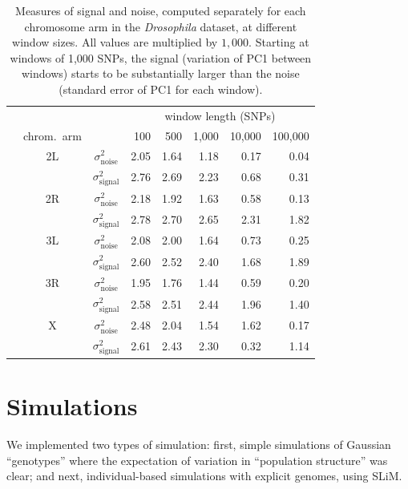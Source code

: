 \documentclass[11pt, oneside]{article}   	%
\begin{document}
\begin{table}[ht]
\centering
    \begin{tabular}{cccrrrrr}
  \hline
        & & & \multicolumn{5}{c}{window length (SNPs)} \\
 & chrom.\ arm  & & 100 & 500 & 1,000 & 10,000 & 100,000 \\ 
  \hline
    & 2L & $\sigma^2_\text{noise}$  & 2.05  &  1.64  &  1.18  &  0.17  &  0.04 \\
    & 	 & $\sigma^2_\text{signal}$ & 2.76  &  2.69  &  2.23  &  0.68  &  0.31 \\
    & 2R & $\sigma^2_\text{noise}$  & 2.18  &  1.92  &  1.63  &  0.58  &  0.13 \\
    & 	 & $\sigma^2_\text{signal}$ & 2.78  &  2.70  &  2.65  &  2.31  &  1.82 \\
    & 3L & $\sigma^2_\text{noise}$  & 2.08  &  2.00  &  1.64  &  0.73  &  0.25 \\
    & 	 & $\sigma^2_\text{signal}$ & 2.60  &  2.52  &  2.40  &  1.68  &  1.89 \\
    & 3R & $\sigma^2_\text{noise}$  & 1.95  &  1.76  &  1.44  &  0.59  &  0.20 \\
    & 	 & $\sigma^2_\text{signal}$ & 2.58  &  2.51  &  2.44  &  1.96  &  1.40 \\
    & X  & $\sigma^2_\text{noise}$  & 2.48  &  2.04  &  1.54  &  1.62  &  0.17 \\
    & 	 & $\sigma^2_\text{signal}$ & 2.61  &  2.43  &  2.30  &  0.32  &  1.14 \\
   \hline
\end{tabular}
\caption{
    Measures of signal and noise,
    computed separately for each chromosome arm in the \textit{Drosophila} dataset,
    at different window sizes.
    All values are multiplied by $1,000$.
    Starting at windows of 1,000 SNPs, the signal (variation of PC1 between windows)
    starts to be substantially larger than the noise (standard error of PC1 for each window).
} \label{tab:window_sizes}
\end{table}


\section{Simulations}

We implemented two types of simulation:
first, simple simulations of Gaussian ``genotypes'' 
where the expectation of variation in ``population structure'' was clear;
and next, individual-based simulations with explicit genomes, using SLiM.
\end{document}
